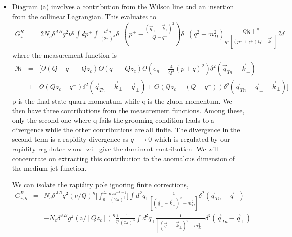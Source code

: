 \documentclass[letter,11pt]{article}
\newcommand{\nn}{\nonumber}
\newcommand{\bea}{\begin{eqnarray}}
\newcommand{\eea}{\end{eqnarray}}
\def\nn{\nonumber}
\begin{document}
\begin{itemize}
\item{} Diagram (a) involves a contribution from the Wilson line and an insertion from the collinear Lagrangian. This evaluates to
\small 
\bea
 G_a^R &=& 2N_c\delta^{AB}g^2\nu^{\eta}\int dp^+\int \frac{d^4q}{(2\pi)^{3}}\delta^+(p^+-\frac{(\vec{q}_{\perp}+\vec{k}_{\perp})^2}{Q-q^-})\delta^+(q^2-m_D^2)\frac{Q|q^-|^{-\eta}}{q^-[(p^++q^+)Q-\vec{k}_{\perp}^2]}\mathcal{M}\nn
\eea
\normalsize
where the measurement function is 
\bea
\mathcal{M}&=&\Big[\Theta(Q-q^--Qz_{c})\Theta(q^--Qz_{c})\Theta(e_n- \frac{4}{Q^2}(p+q)^2)\delta^2(\vec{q}_{Tn}-\vec{k}_{\perp})\nn\\
&+& \Theta(Qz_{c}-q^-)\delta^2(\vec{q}_{Tn}-\vec{k}_{\perp}-\vec{q}_{\perp})+\Theta(Qz_{c}-(Q-q^-))\delta^2(\vec{q}_{Tn}+\vec{q}_{\perp}-\vec{k}_{\perp})\Big]\nn
\eea
p is the final state quark momentum while q is the gluon momentum. We then have three contributions from the measurement functions. Among these, only the second one where q fails the grooming condition leads to a divergence while the other contributions are all finite. The divergence in the second term is a rapidity divergence as $q^-\rightarrow 0$ which is regulated by our rapidity regulator $\nu$ and will give the dominant contribution. We will concentrate on extracting this contribution to the anomalous dimension of the medium jet function.

We can isolate the rapidity pole ignoring finite corrections,
\bea
 G_{a,\eta}^R&=&N_c\delta^{AB}g^2(\nu/Q)^{\eta}\Bigg[\int_0^{z_{c}} \frac{dzz^{-1-\eta}}{(2\pi)^{3}}\Bigg]\int d^2q_{\perp}\frac{1}{[(\vec{q}_{\perp}-\vec{k}_{\perp})^2+m_D^2]}\delta^2(\vec{q}_{Tn}-\vec{q}_{\perp})\nn\\
&=& -N_c\delta^{AB}g^2(\nu/[Qz_c])^{\eta}\frac{1}{\eta}\frac{1}{(2\pi)^{3}}\int d^2q_{\perp}\frac{1}{[(\vec{q}_{\perp}-\vec{k}_{\perp})^2+m_D^2]}\delta^2(\vec{q}_{Tn}-\vec{q}_{\perp})
\eea 



\end{itemize}
\end{document}
